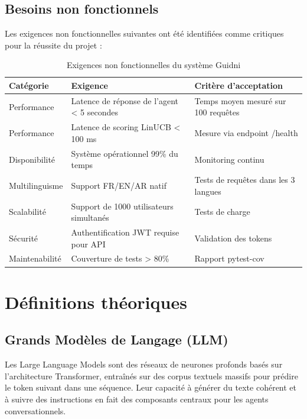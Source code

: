 \subsection{Besoins non fonctionnels}

Les exigences non fonctionnelles suivantes ont été identifiées comme critiques pour la réussite du projet :

\begin{table}[H]
    \centering
    \caption{Exigences non fonctionnelles du système Guidni}
    \label{tab:nfr}
    \small
    \begin{tabular}{p{2cm} p{6cm} p{5cm}}
        \toprule
        \textbf{Catégorie} & \textbf{Exigence} & \textbf{Critère d'acceptation} \\
        \midrule
        Performance & Latence de réponse de l'agent < 5 secondes & Temps moyen mesuré sur 100 requêtes \\
        Performance & Latence de scoring LinUCB < 100 ms & Mesure via endpoint /health \\
        Disponibilité & Système opérationnel 99\% du temps & Monitoring continu \\
        Multilinguisme & Support FR/EN/AR natif & Tests de requêtes dans les 3 langues \\
        Scalabilité & Support de 1000 utilisateurs simultanés & Tests de charge \\
        Sécurité & Authentification JWT requise pour API & Validation des tokens \\
        Maintenabilité & Couverture de tests > 80\% & Rapport pytest-cov \\
        \bottomrule
    \end{tabular}
\end{table}


\section{Définitions théoriques}

\subsection{Grands Modèles de Langage (LLM)}

Les Large Language Models sont des réseaux de neurones profonds basés sur l'architecture Transformer, entraînés sur des corpus textuels massifs pour prédire le token suivant dans une séquence. Leur capacité à générer du texte cohérent et à suivre des instructions en fait des composants centraux pour les agents conversationnels.

